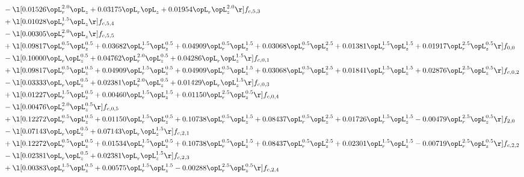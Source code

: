 \begin{alignat}{2}
& - \l[  0.01526 \opL_r^{2.0} \opL_z +  0.03175 \opL_r \opL_z +  0.01954 \opL_r \opL_z^{2.0}  \r] f_{c,5,3} \nonumber \\ 
& + \l[  0.01028 \opL_r^{1.5} \opL_z  \r] f_{c,5,4} \nonumber \\ 
& - \l[  0.00305 \opL_r^{2.0} \opL_z  \r] f_{c,5,5} \nonumber \\ 
& + \l[  0.09817 \opL_r^{0.5} \opL_z^{0.5} +  0.03682 \opL_r^{1.5} \opL_z^{0.5} +  0.04909 \opL_r^{0.5} \opL_z^{1.5} +  0.03068 \opL_r^{0.5} \opL_z^{2.5} +  0.01381 \opL_r^{1.5} \opL_z^{1.5} +  0.01917 \opL_r^{2.5} \opL_z^{0.5}  \r] f_{0,0} \nonumber \\ 
& - \l[  0.10000 \opL_r \opL_z^{0.5} +  0.04762 \opL_r^{2.0} \opL_z^{0.5} +  0.04286 \opL_r \opL_z^{1.5}  \r] f_{c,0,1} \nonumber \\ 
& + \l[  0.09817 \opL_r^{0.5} \opL_z^{0.5} +  0.04909 \opL_r^{1.5} \opL_z^{0.5} +  0.04909 \opL_r^{0.5} \opL_z^{1.5} +  0.03068 \opL_r^{0.5} \opL_z^{2.5} +  0.01841 \opL_r^{1.5} \opL_z^{1.5} +  0.02876 \opL_r^{2.5} \opL_z^{0.5}  \r] f_{c,0,2} \nonumber \\ 
& - \l[  0.03333 \opL_r \opL_z^{0.5} +  0.02381 \opL_r^{2.0} \opL_z^{0.5} +  0.01429 \opL_r \opL_z^{1.5}  \r] f_{c,0,3} \nonumber \\ 
& + \l[  0.01227 \opL_r^{1.5} \opL_z^{0.5} +  0.00460 \opL_r^{1.5} \opL_z^{1.5} +  0.01150 \opL_r^{2.5} \opL_z^{0.5}  \r] f_{c,0,4} \nonumber \\ 
& - \l[  0.00476 \opL_r^{2.0} \opL_z^{0.5}  \r] f_{c,0,5} \nonumber \\ 
& + \l[  0.12272 \opL_r^{0.5} \opL_z^{0.5} +  0.01150 \opL_r^{1.5} \opL_z^{0.5} +  0.10738 \opL_r^{0.5} \opL_z^{1.5} +  0.08437 \opL_r^{0.5} \opL_z^{2.5} +  0.01726 \opL_r^{1.5} \opL_z^{1.5}   -0.00479 \opL_r^{2.5} \opL_z^{0.5}  \r] f_{2,0} \nonumber \\ 
& - \l[  0.07143 \opL_r \opL_z^{0.5} +  0.07143 \opL_r \opL_z^{1.5}  \r] f_{c,2,1} \nonumber \\ 
& + \l[  0.12272 \opL_r^{0.5} \opL_z^{0.5} +  0.01534 \opL_r^{1.5} \opL_z^{0.5} +  0.10738 \opL_r^{0.5} \opL_z^{1.5} +  0.08437 \opL_r^{0.5} \opL_z^{2.5} +  0.02301 \opL_r^{1.5} \opL_z^{1.5}   -0.00719 \opL_r^{2.5} \opL_z^{0.5}  \r] f_{c,2,2} \nonumber \\ 
& - \l[  0.02381 \opL_r \opL_z^{0.5} +  0.02381 \opL_r \opL_z^{1.5}  \r] f_{c,2,3} \nonumber \\ 
& + \l[  0.00383 \opL_r^{1.5} \opL_z^{0.5} +  0.00575 \opL_r^{1.5} \opL_z^{1.5}   -0.00288 \opL_r^{2.5} \opL_z^{0.5}  \r] f_{c,2,4} \nonumber \\ 

\end{alignat}
